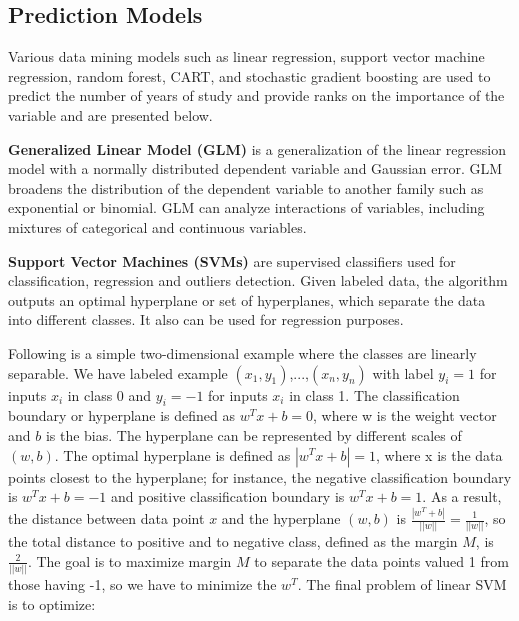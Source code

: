 \documentclass[12pt,english]{report}
\begin{document}
\subsection{Prediction Models}
Various data mining models such as linear regression, support vector machine regression, random forest, CART, and stochastic gradient boosting are used to predict the number of years of study and provide ranks on the importance of the variable and are presented below.

\vspace{0.15in}
\noindent \textbf{Generalized Linear Model (GLM)} is a generalization of the linear regression model with a normally distributed dependent variable and Gaussian error. GLM broadens the distribution of the dependent variable to another family such as exponential or binomial. GLM can analyze interactions of variables, including mixtures of categorical and continuous variables.

\vspace{0.15in}
\noindent \textbf{Support Vector Machines (SVMs)} are supervised classifiers used for classification, regression and outliers detection. Given labeled data, the algorithm outputs an optimal hyperplane or set of hyperplanes, which separate the data into different classes. It also can be used for regression purposes.

Following is a simple two-dimensional example where the classes are linearly separable.  We have labeled example $(x_1,y_1)$,...,$(x_n, y_n)$ with label $y_i = 1$ for inputs $x_i$ in class 0 and $y_i = -1$ for inputs $x_i$ in class 1. The classification boundary or hyperplane is defined as $w^T x +b = 0$, where w is the weight vector and $b$ is the bias. The hyperplane can be represented by different scales of $(w,b)$. The optimal hyperplane is defined as $|w^T x +b | = 1$, where x is the data points closest to the hyperplane; for instance, the negative classification boundary is $w^T x +b = -1$ and positive classification boundary is $w^T x +b  = 1$. As a result, the distance between data point $x$ and the hyperplane $(w,b)$ is $ \frac{|w^T+b|}{||w||}= \frac{1}{||w||}$, so the total distance to positive and to negative class, defined as the margin $M$, is $\frac{2}{||w||}$.  The goal is to maximize margin $M$ to separate the data points valued 1 from those having -1, so we have to minimize the $w^T$. The final problem of linear SVM is to optimize:
\end{document}
